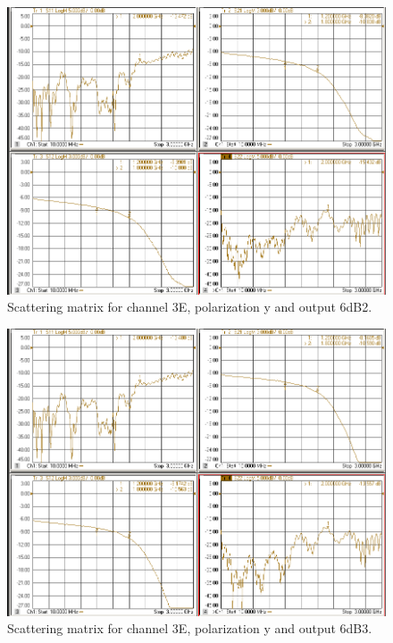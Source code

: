 \documentclass[12pt,a4paper,oneside]{article}
\begin{document}
\begin{figure}[H]
\centering
\includegraphics[width=0.9\linewidth]{VNA_results/3Ey_6dB2.png}
\caption{Scattering matrix for channel 3E, polarization y and output 6dB2.}
\label{fig:3Ey_6dB2}
\end{figure}


\begin{figure}[H]
\centering
\includegraphics[width=0.9\linewidth]{VNA_results/3Ey_6dB3.png}
\caption{Scattering matrix for channel 3E, polarization y and output 6dB3.}
\label{fig:3Ey_6dB3}
\end{figure}
\end{document}
